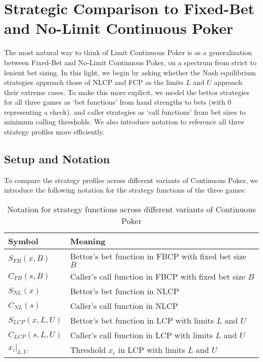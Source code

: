\documentclass[../../main/main.tex]{subfiles}
\begin{document}
\section{Strategic Comparison to Fixed-Bet and No-Limit Continuous Poker}
The most natural way to think of Limit Continuous Poker is as a generalization between Fixed-Bet and No-Limit Continuous Poker, on a spectrum from strict to lenient bet sizing. In this light, we begin by asking whether the Nash equilibrium strategies approach those of NLCP and FCP as the limits $L$ and $U$ approach their extreme cases. To make this more explicit, we model the bettor strategies for all three games as `bet functions' from hand strengths to bets (with 0 representing a check), and caller strategies as `call functions' from bet sizes to minimum calling thresholds. We also introduce notation to reference all three strategy profiles more efficiently.

\subsection{Setup and Notation}

To compare the strategy profiles across different variants of Continuous Poker, we introduce the following notation for the strategy functions of the three games:

\begin{table}[h]
\centering
\begin{tabular}{|l|l|}
\hline
\textbf{Symbol} & \textbf{Meaning} \\
\hline
$S_{FB}(x, B)$ & Bettor's bet function in FBCP with fixed bet size $B$ \\
$C_{FB}(s, B)$ & Caller's call function in FBCP with fixed bet size $B$ \\
$S_{NL}(x)$ & Bettor's bet function in NLCP \\
$C_{NL}(s)$ & Caller's call function in NLCP \\
$S_{LCP}(x, L, U)$ & Bettor's bet function in LCP with limits $L$ and $U$ \\
$C_{LCP}(s, L, U)$ & Caller's call function in LCP with limits $L$ and $U$ \\
$x_i|_{L,U}$ & Threshold $x_i$ in LCP with limits $L$ and $U$ \\
\hline
\end{tabular}
\caption{Notation for strategy functions across different variants of Continuous Poker}
\label{tab:notation}
\end{table}
\end{document}
